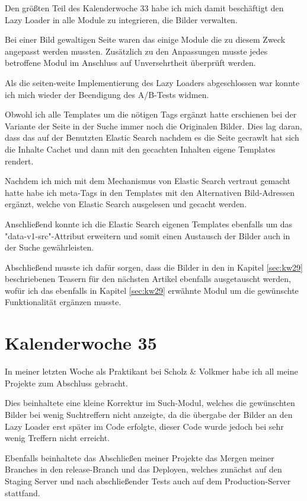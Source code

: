 \documentclass[11pt]{article} %
\begin{document}
Den größten Teil des Kalenderwoche 33 habe ich mich damit beschäftigt den Lazy Loader in alle Module zu integrieren, die Bilder verwalten.

Bei einer Bild gewaltigen Seite waren das einige Module die zu diesem Zweck angepasst werden mussten.
Zusätzlich zu den Anpassungen musste jedes betroffene Modul im Anschluss auf Unversehrtheit überprüft werden.

Als die seiten-weite Implementierung des Lazy Loaders abgeschlossen war konnte ich mich wieder der Beendigung des A/B-Tests widmen.

Obwohl ich alle Templates um die nötigen Tags ergänzt hatte erschienen bei der Variante der Seite in der Suche immer noch die Originalen Bilder. Dies lag daran, dass das auf der Benutzten Elastic Search nachdem es die Seite gecrawlt hat sich die Inhalte Cachet und dann mit den gecachten Inhalten eigene Templates rendert.

Nachdem ich mich mit dem Mechanismus von Elastic Search vertraut gemacht hatte habe ich meta-Tags in den Templates mit den Alternativen Bild-Adressen ergänzt, welche von Elastic Search ausgelesen und gecacht werden.

Anschließend konnte ich die Elastic Search eigenen Templates ebenfalls um das "data-v1-src"-Attribut erweitern und somit einen Austausch der Bilder auch in der Suche gewährleisten.

Abschließend musste ich dafür sorgen, dass die Bilder in den in Kapitel \ref{sec:kw29} beschriebenen Teasern für den nächsten Artikel ebenfalls ausgetauscht werden, wofür ich das ebenfalls in Kapitel \ref{sec:kw29} erwähnte Modul um die gewünschte Funktionalität ergänzen musste.

\section{Kalenderwoche 35} \label{sec:kw35}

In meiner letzten Woche als Praktikant bei Scholz \& Volkmer habe ich all meine Projekte zum Abschluss gebracht.

Dies beinhaltete eine kleine Korrektur im Such-Modul, welches die gewünschten Bilder bei wenig Suchtreffern nicht anzeigte, da die übergabe der Bilder an den Lazy Loader erst später im Code erfolgte, dieser Code wurde jedoch bei sehr wenig Treffern nicht erreicht.

Ebenfalls beinhaltete das Abschließen meiner Projekte das Mergen meiner Branches in den release-Branch und das Deployen, welches zunächst auf den Staging Server und nach abschließender Tests auch auf dem Production-Server stattfand.
\end{document}
